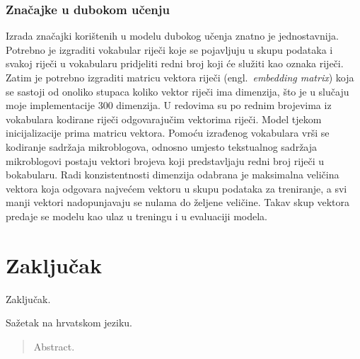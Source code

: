 \documentclass[times, utf8, zavrsni]{fer}
\begin{document}
\subsection{Značajke u dubokom učenju}

Izrada značajki korištenih u modelu dubokog učenja znatno je jednostavnija. Potrebno je izgraditi vokabular riječi koje se pojavljuju u skupu podataka i svakoj riječi u vokabularu pridjeliti redni broj koji će služiti kao oznaka riječi. Zatim je potrebno izgraditi matricu vektora riječi (engl.~\emph{embedding matrix}) koja se sastoji od onoliko stupaca koliko vektor riječi ima dimenzija, što je u slučaju moje implementacije 300 dimenzija. U redovima su po rednim brojevima iz vokabulara kodirane riječi odgovarajučim vektorima riječi. Model tjekom inicijalizacije prima matricu vektora. Pomoću izrađenog vokabulara vrši se kodiranje sadržaja mikroblogova, odnosno umjesto tekstualnog sadržaja mikroblogovi postaju vektori brojeva koji predstavljaju redni broj riječi u bokabularu. Radi konzistentnosti dimenzija odabrana je maksimalna veličina vektora koja odgovara najvećem vektoru u skupu podataka za treniranje, a svi manji vektori nadopunjavaju se nulama do željene veličine. Takav skup vektora predaje se modelu kao ulaz u treningu i u evaluaciji modela.

\chapter{Zaključak}

Zaključak.


\printglossaries

\begin{sazetak}
Sažetak na hrvatskom jeziku.

\end{sazetak}

\begin{abstract}
Abstract.

\end{abstract}
\end{document}
